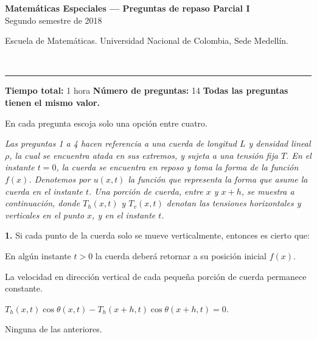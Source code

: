 \documentclass[11pt]{article}
\newcommand{\examheader}{%
  \noindent
  \begin{minipage}[t]{0.6\linewidth}
    {\small\bfseries Matem\'aticas Especiales --- Preguntas de repaso Parcial I}\\
    {\small Segundo semestre de 2018}
  \end{minipage}%
  \hfill
  \begin{minipage}[t]{0.35\linewidth}
    \raggedleft\small Escuela de Matem\'aticas. Universidad Nacional de Colombia, Sede Medell\'in.
  \end{minipage}\\[2pt]
  \rule{\linewidth}{0.6pt}
}
\begin{document}
\examheader

\vspace{4pt}
\textbf{Tiempo total:} 1 hora \quad \textbf{N\'umero de preguntas:} 14 \quad \textbf{Todas las preguntas tienen el mismo valor.}

En cada pregunta escoja solo una opci\'on entre cuatro.

\vspace{6pt}
\noindent\textit{Las preguntas 1 a 4 hacen referencia a una cuerda de longitud $L$ y densidad lineal $\rho$, la cual se encuentra atada en sus extremos, y sujeta a una tensi\'on fija $T$. En el instante $t=0$, la cuerda se encuentra en reposo y toma la forma de la funci\'on $f(x)$. Denotemos por $u(x,t)$ la funci\'on que representa la forma que asume la cuerda en el instante $t$. Una porci\'on de cuerda, entre $x$ y $x+h$, se muestra a continuaci\'on, donde $T_h(x,t)$ y $T_v(x,t)$ denotan las tensiones horizontales y verticales en el punto $x$, y en el instante $t$.}

\begin{center}
\end{center}

\vspace{4pt}
\textbf{1.} Si cada punto de la cuerda solo se mueve verticalmente, entonces es cierto que:
\begin{opciones}
  \item En alg\'un instante $t>0$ la cuerda deber\'a retornar a su posici\'on inicial $f(x)$.
  \item La velocidad en direcci\'on vertical de cada peque\~na porci\'on de cuerda permanece constante.
  \item $T_h(x,t)\cos\theta(x,t) - T_h(x+h,t)\cos\theta(x+h,t) = 0$.
  \item Ninguna de las anteriores.
\end{opciones}
\end{document}
